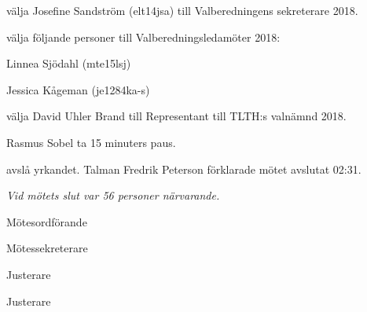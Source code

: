 \documentclass[10pt]{article}
\def\mo{Fredrik Peterson}
\def\ms{Johan Karlberg}
\def\ji{David Uhler Brand}
\def\jii{Anders Nilsson}
\begin{document}
\begin{paragrafer}
\begin{paralist}
    \Mba välja Josefine Sandström (elt14jsa) till Valberedningens sekreterare 2018.

    \Mba välja följande personer till Valberedningsledamöter 2018:
    \begin{tightdashlist}
        \item Linnea Sjödahl (mte15lsj)
        \item Jessica Kågeman (je1284ka-s)
    \end{tightdashlist}


    \Mba välja David Uhler Brand till Representant till TLTH:s valnämnd 2018.

\end{paralist}

Rasmus Sobel \ypa ta 15 minuters paus.

\Mba avslå yrkandet.
Talman {\mo} förklarade mötet avslutat 02:31.

\emph{Vid mötets slut var 56 personer närvarande.}

\end{paragrafer}

\hidesignfoot
\begin{signatures}{4}
\signature{\mo}{Mötesordförande}
\signature{\ms}{Mötessekreterare}
\signature{\ji}{Justerare}
\signature{\jii}{Justerare}
\end{signatures}
\end{document}
